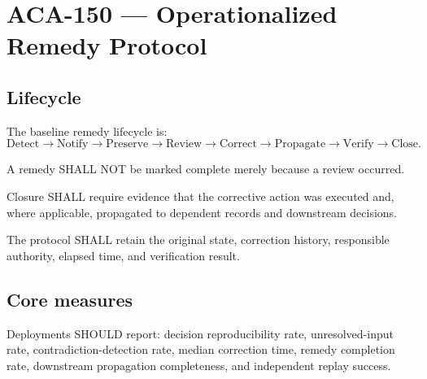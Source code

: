 \chapter{ACA-150 --- Operationalized Remedy Protocol}
\section{Lifecycle}
The baseline remedy lifecycle is:
\[
\text{Detect}\rightarrow\text{Notify}\rightarrow\text{Preserve}\rightarrow
\text{Review}\rightarrow\text{Correct}\rightarrow\text{Propagate}\rightarrow
\text{Verify}\rightarrow\text{Close}.
\]

\begin{requirement}[ACA-150-001]
A remedy SHALL NOT be marked complete merely because a review occurred.
\end{requirement}
\begin{requirement}[ACA-150-002]
Closure SHALL require evidence that the corrective action was executed and, where applicable, propagated to dependent records and downstream decisions.
\end{requirement}
\begin{requirement}[ACA-150-003]
The protocol SHALL retain the original state, correction history, responsible authority, elapsed time, and verification result.
\end{requirement}

\section{Core measures}
Deployments SHOULD report: decision reproducibility rate, unresolved-input rate, contradiction-detection rate, median correction time, remedy completion rate, downstream propagation completeness, and independent replay success.
